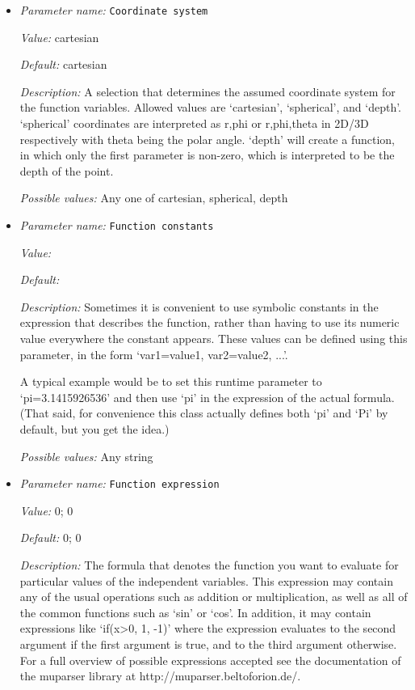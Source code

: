 \begin{itemize}
\item {\it Parameter name:} {\tt Coordinate system}
\label{parameters:Boundary traction model/Function/Coordinate system}


{\it Value:} cartesian


{\it Default:} cartesian


{\it Description:} A selection that determines the assumed coordinate system for the function variables. Allowed values are `cartesian', `spherical', and `depth'. `spherical' coordinates are interpreted as r,phi or r,phi,theta in 2D/3D respectively with theta being the polar angle. `depth' will create a function, in which only the first parameter is non-zero, which is interpreted to be the depth of the point.


{\it Possible values:} Any one of cartesian, spherical, depth
\item {\it Parameter name:} {\tt Function constants}
\label{parameters:Boundary traction model/Function/Function constants}


{\it Value:} 


{\it Default:} 


{\it Description:} Sometimes it is convenient to use symbolic constants in the expression that describes the function, rather than having to use its numeric value everywhere the constant appears. These values can be defined using this parameter, in the form `var1=value1, var2=value2, ...'.

A typical example would be to set this runtime parameter to `pi=3.1415926536' and then use `pi' in the expression of the actual formula. (That said, for convenience this class actually defines both `pi' and `Pi' by default, but you get the idea.)


{\it Possible values:} Any string
\item {\it Parameter name:} {\tt Function expression}
\label{parameters:Boundary traction model/Function/Function expression}


{\it Value:} 0; 0


{\it Default:} 0; 0


{\it Description:} The formula that denotes the function you want to evaluate for particular values of the independent variables. This expression may contain any of the usual operations such as addition or multiplication, as well as all of the common functions such as `sin' or `cos'. In addition, it may contain expressions like `if(x>0, 1, -1)' where the expression evaluates to the second argument if the first argument is true, and to the third argument otherwise. For a full overview of possible expressions accepted see the documentation of the muparser library at http://muparser.beltoforion.de/.


\end{itemize}
